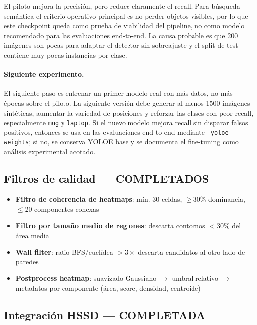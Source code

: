 \documentclass[11pt,a4paper]{article}
\begin{document}
El piloto mejora la precisión, pero reduce claramente el recall. Para búsqueda
semántica el criterio operativo principal es no perder objetos visibles, por lo
que este checkpoint queda como prueba de viabilidad del pipeline, no como
modelo recomendado para las evaluaciones end-to-end. La causa probable es que
200 imágenes son pocas para adaptar el detector sin sobreajuste y el split de
test contiene muy pocas instancias por clase.

\paragraph{Siguiente experimento.} El siguiente paso es entrenar un primer
modelo real con más datos, no más épocas sobre el piloto. La siguiente versión
debe generar al menos 1500 imágenes sintéticas, aumentar la variedad de
posiciones y reforzar las clases con peor recall, especialmente \texttt{mug} y
\texttt{laptop}. Si el nuevo modelo mejora recall sin disparar falsos positivos,
entonces se usa en las evaluaciones end-to-end mediante \texttt{--yoloe-weights};
si no, se conserva YOLOE base y se documenta el fine-tuning como análisis
experimental acotado.

\subsection{Filtros de calidad --- \textcolor{done}{COMPLETADOS}}

\begin{itemize}
  \item[\checkmark] \textbf{Filtro de coherencia de heatmaps}:
        mín. 30 celdas, $\geq$30\% dominancia, $\leq$20 componentes conexas
  \item[\checkmark] \textbf{Filtro por tamaño medio de regiones}:
        descarta contornos $<$30\% del área media
  \item[\checkmark] \textbf{Wall filter}:
        ratio BFS/euclídea $>3\times$ descarta candidatos al otro lado de paredes
  \item[\checkmark] \textbf{Postprocess heatmap}: suavizado Gaussiano $\rightarrow$ umbral
        relativo $\rightarrow$ metadatos por componente (área, score, densidad, centroide)
\end{itemize}

\subsection{Integración HSSD --- \textcolor{done}{COMPLETADA}}
\end{document}
